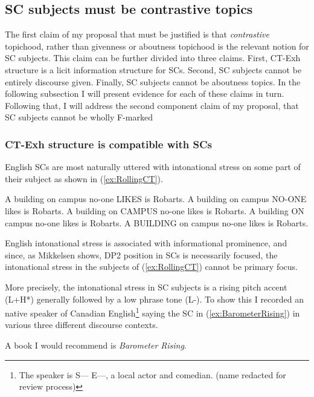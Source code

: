 \documentclass[
	letterpaper,
]{article}
\begin{document}
\subsection{SC subjects must be contrastive topics}
The first claim of my proposal that must be justified is that \textit{contrastive} topichood, rather than givenness or aboutness topichood is the relevant notion for SC subjects.
This claim can be further divided into three claims.
First, CT-Exh structure is a licit information structure for SCs.
Second, SC subjects cannot be entirely discourse given.
Finally, SC subjects cannot be aboutness topics.
In the following subsection I will present evidence for each of these claims in turn.
Following that, I will address the second component claim of my proposal, that SC subjects cannot be wholly F-marked
\subsubsection{CT-Exh structure is compatible with SCs}\label{sec:CanBeCTs}
English SCs are most naturally uttered with intonational stress on some part of their subject as shown in (\ref{ex:RollingCT}).
\begin{exe}
	\ex\label{ex:RollingCT}
	\begin{xlist}
		\ex A building on campus no-one LIKES is Robarts.
		\ex A building on campus NO-ONE likes is Robarts.
		\ex A building on CAMPUS no-one likes is Robarts.
		\ex A building ON campus no-one likes is Robarts.
		\ex A BUILDING on campus no-one likes is Robarts.
	\end{xlist}
\end{exe}

English intonational stress is associated with informational prominence, and since, as Mikkelsen shows, DP2 position in SCs is necessarily focused, the intonational stress in the subjects of (\ref{ex:RollingCT}) cannot be primary focus.

More precisely, the intonational stress in SC subjects is a rising pitch accent (L+H*) generally followed by a low phrase tone (L-).
To show this I recorded an native speaker of Canadian English\footnote{
	The speaker is  S--- E---, a local actor and comedian. (name redacted for review process)
} saying the SC in (\ref{ex:BarometerRising}) in various three different discourse contexts.
\begin{exe}
	\ex \label{ex:BarometerRising} A book I would recommend is \textit{Barometer Rising}.
\end{exe}
\end{document}
